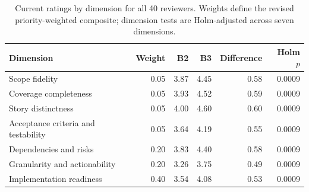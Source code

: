 \begin{table}[t]
\caption{Current ratings by dimension for all 40 reviewers. Weights define the revised priority-weighted composite; dimension tests are Holm-adjusted across seven dimensions.}
\label{tab:matched-quality-factors}
\centering\small
\begin{tabular}{lrrrrr}
\toprule
Dimension & Weight & B2 & B3 & Difference & Holm $p$ \\
\midrule
Scope fidelity & 0.05 & 3.87 & 4.45 & 0.58 & 0.0009 \\
Coverage completeness & 0.05 & 3.93 & 4.52 & 0.59 & 0.0009 \\
Story distinctness & 0.05 & 4.00 & 4.60 & 0.60 & 0.0009 \\
Acceptance criteria and testability & 0.05 & 3.64 & 4.19 & 0.55 & 0.0009 \\
Dependencies and risks & 0.20 & 3.83 & 4.40 & 0.58 & 0.0009 \\
Granularity and actionability & 0.20 & 3.26 & 3.75 & 0.49 & 0.0009 \\
Implementation readiness & 0.40 & 3.54 & 4.08 & 0.53 & 0.0009 \\
\bottomrule
\end{tabular}
\end{table}
